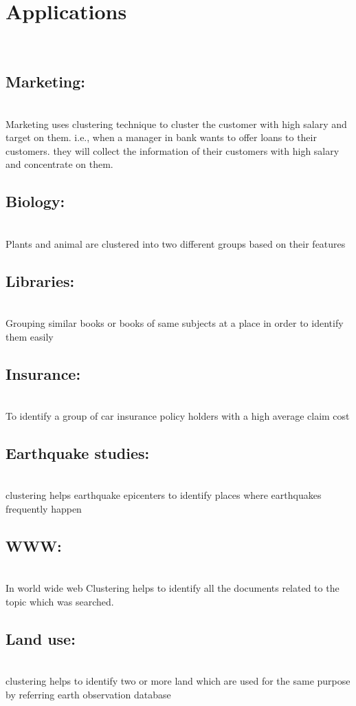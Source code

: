 \documentclass[11pt]{article}
\begin{document}
\section{Applications}\\

\subsection{Marketing:}\\ Marketing uses clustering technique to cluster the customer with high salary and target on  them. i.e., when a manager in bank wants to offer loans to their customers. they will collect the information of their customers with high salary and concentrate on them.

\subsection{Biology:}\\  Plants and animal are clustered into two different groups based on  their features

\subsection{ Libraries:}\\ Grouping similar books or books of same subjects at a place in order to identify them easily

\subsection{Insurance:}\\ To identify a group of car insurance policy holders with a high average claim cost

\subsection{Earthquake studies:}\\  clustering helps earthquake epicenters to identify places where earthquakes frequently happen

\subsection{WWW:}\\  In world wide web Clustering helps to identify all the documents related to the topic which was searched.

\subsection{Land use:}\\  clustering  helps to identify two or more land which are used for the same purpose by referring earth observation database
\end{document}
